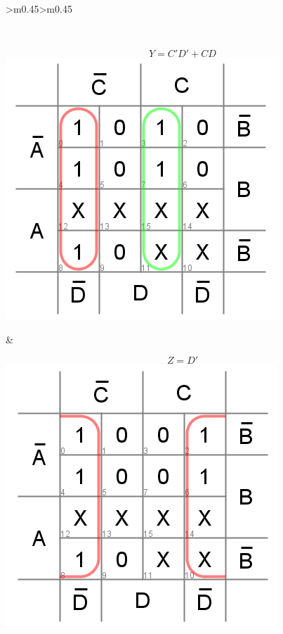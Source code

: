\documentclass{article}
\begin{document}
\begin{center}
\begin{tabular}{>{\centering\arraybackslash}m{0.45\textwidth}>{\centering\arraybackslash}m{0.45\textwidth}}
\begin{minipage}[t]{\linewidth}
\end{minipage}
\\
\begin{minipage}[t]{\linewidth}
    \centering
    $$Y = C'D' + CD$$
    \includegraphics[width=0.8\linewidth]{xs3-kmap-Y.png}
\end{minipage}
&
\begin{minipage}[t]{\linewidth}
    \centering
    $$Z = D'$$
    \includegraphics[width=0.8\linewidth]{xs3-kmap-Z.png}
\end{minipage}
\\
\end{tabular}
\end{center}
\end{document}
